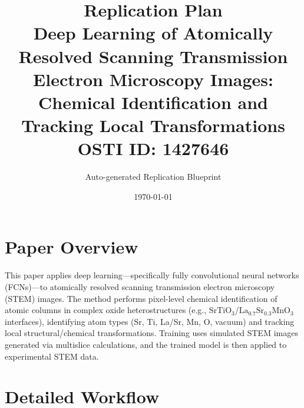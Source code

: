 \documentclass[11pt,a4paper]{article}
\title{\textbf{Replication Plan}\\[0.5em]
\large Deep Learning of Atomically Resolved Scanning Transmission Electron Microscopy Images: Chemical Identification and Tracking Local Transformations\\[0.3em]
\normalsize OSTI ID: 1427646}
\author{Auto-generated Replication Blueprint}
\date{\today}
\begin{document}
\maketitle
\tableofcontents
\newpage

\section{Paper Overview}
This paper applies deep learning---specifically fully convolutional neural networks (FCNs)---to atomically resolved scanning transmission electron microscopy (STEM) images. The method performs pixel-level chemical identification of atomic columns in complex oxide heterostructures (e.g., $\mathrm{SrTiO_3}$/$\mathrm{La_{0.7}Sr_{0.3}MnO_3}$ interfaces), identifying atom types (Sr, Ti, La/Sr, Mn, O, vacuum) and tracking local structural/chemical transformations. Training uses simulated STEM images generated via multislice calculations, and the trained model is then applied to experimental STEM data.

\section{Detailed Workflow}
\end{document}
